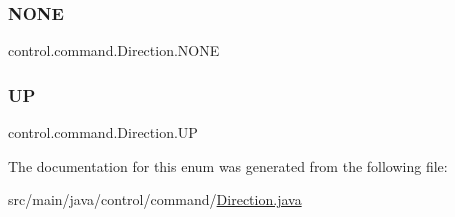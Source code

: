 \subsubsection{\texorpdfstring{NONE}{NONE}}
{\footnotesize\ttfamily control.\+command.\+Direction.\+N\+O\+NE}

\mbox{\label{enumcontrol_1_1command_1_1_direction_adb50bdf4a75fea7f0cb851c1e5a42dd9}} 
\subsubsection{\texorpdfstring{UP}{UP}}
{\footnotesize\ttfamily control.\+command.\+Direction.\+UP}



The documentation for this enum was generated from the following file\+:\begin{DoxyCompactItemize}
\item 
src/main/java/control/command/\mbox{\hyperlink{_direction_8java}{Direction.\+java}}\end{DoxyCompactItemize}
